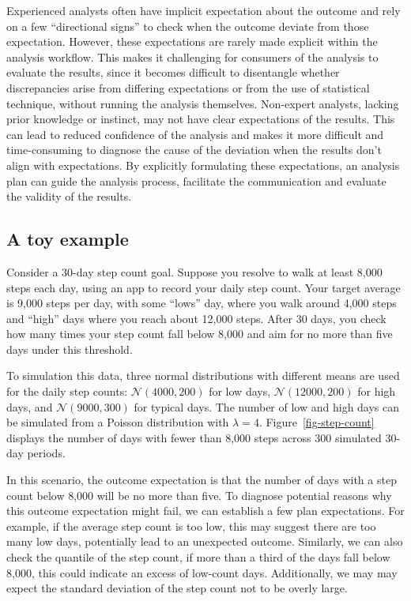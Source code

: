 \documentclass[
]{jds}
\begin{document}
Experienced analysts often have implicit expectation about the outcome
and rely on a few ``directional signs'' to check when the outcome
deviate from those expectation. However, these expectations are rarely
made explicit within the analysis workflow. This makes it challenging
for consumers of the analysis to evaluate the results, since it becomes
difficult to disentangle whether discrepancies arise from differing
expectations or from the use of statistical technique, without running
the analysis themselves. Non-expert analysts, lacking prior knowledge or
instinct, may not have clear expectations of the results. This can lead
to reduced confidence of the analysis and makes it more difficult and
time-consuming to diagnose the cause of the deviation when the results
don't align with expectations. By explicitly formulating these
expectations, an analysis plan can guide the analysis process,
facilitate the communication and evaluate the validity of the results.

\subsection{A toy example}\label{a-toy-example}

Consider a 30-day step count goal. Suppose you resolve to walk at least
8,000 steps each day, using an app to record your daily step count. Your
target average is 9,000 steps per day, with some ``lows'' day, where you
walk around 4,000 steps and ``high'' days where you reach about 12,000
steps. After 30 days, you check how many times your step count fall
below 8,000 and aim for no more than five days under this threshold.

To simulation this data, three normal distributions with different means
are used for the daily step counts: \(\mathcal{N}(4000, 200)\) for low
days, \(\mathcal{N}(12000, 200)\) for high days, and
\(\mathcal{N}(9000, 300)\) for typical days. The number of low and high
days can be simulated from a Poisson distribution with \(\lambda = 4\).
Figure~\ref{fig-step-count} displays the number of days with fewer than
8,000 steps across 300 simulated 30-day periods.

In this scenario, the outcome expectation is that the number of days
with a step count below 8,000 will be no more than five. To diagnose
potential reasons why this outcome expectation might fail, we can
establish a few plan expectations. For example, if the average step
count is too low, this may suggest there are too many low days,
potentially lead to an unexpected outcome. Similarly, we can also check
the quantile of the step count, if more than a third of the days fall
below 8,000, this could indicate an excess of low-count days.
Additionally, we may may expect the standard deviation of the step count
not to be overly large.
\end{document}
